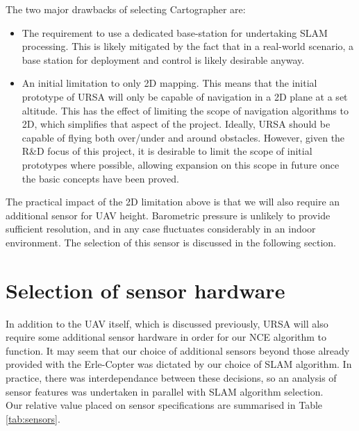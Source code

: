 \documentclass[capstone_report.tex]{subfiles}
\begin{document}
The two major drawbacks of selecting Cartographer are:

\begin{itemize}
 	\item The requirement to use a dedicated base-station for undertaking SLAM processing. This is likely mitigated by the fact that in a real-world scenario, a base station for deployment and control is likely desirable anyway.
 	\item An initial limitation to only 2D mapping. This means that the initial prototype of URSA will only be capable of navigation in a 2D plane at a set altitude. This has the effect of limiting the scope of navigation algorithms to 2D, which simplifies that aspect of the project. Ideally, URSA should be capable of flying both over/under and around obstacles. However, given the R\&D focus of this project, it is desirable to limit the scope of initial prototypes where possible, allowing expansion on this scope in future once the basic concepts have been proved.
\end{itemize}

The practical impact of the 2D limitation above is that we will also require an additional sensor for UAV height. Barometric pressure is unlikely to provide sufficient resolution, and in any case fluctuates considerably in an indoor environment. The selection of this sensor is discussed in the following section. \\

\section{Selection of sensor hardware}
In addition to the UAV itself, which is discussed previously, URSA will also require some additional sensor hardware in order for our NCE algorithm to function. It may seem that our choice of additional sensors beyond those already provided with the Erle-Copter was dictated by our choice of SLAM algorithm. In practice, there was interdependance between these decisions, so an analysis of sensor features was undertaken in parallel with SLAM algorithm selection. \\

Our relative value placed on sensor specifications are summarised in Table \ref{tab:sensors}.
\end{document}
